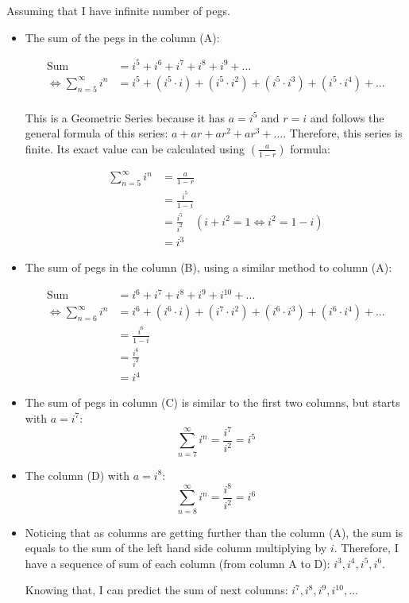 \documentclass[12pt]{article}
\begin{document}
\noindent Assuming that I have infinite number of pegs.
\begin{itemize}
    \item The sum of the pegs in the column (A):

\begin{align*}
    \text{Sum} &= i^5+ i^6+ i^7+ i^8+ i^9+ \dots\\
    \Longleftrightarrow
    \sum_{n=5}^{\infty}i^n &= i^5+ \left(i^5\cdot i\right)+ \left(i^5\cdot i^2\right)+ \left(i^5\cdot i^3\right)+ \left(i^5\cdot i^4\right)+ \dots\\
\end{align*}

This is a Geometric Series because it has $a=i^5$ and $r=i$ and follows the general formula of this series: $a+ar+ar^2+ar^3+\dots$. Therefore, this series is finite. Its exact value can be calculated using $\left(\frac{a}{1-r} \right)$ formula:

\begin{align*}
    \sum_{n=5}^{\infty}i^n &= \frac{a}{1-r}\\
    &= \frac{i^5}{1-i}\\
    &= \frac{i^5}{i^2} \quad\left(i+i^2=1\Longleftrightarrow i^2=1-i\right)\\
    &= i^3
\end{align*}

    \item The sum of pegs in the column (B), using a similar method to column (A):

\begin{align*}
    \text{Sum} &= i^6+ i^7+ i^8+ i^9+ i^{10}+ \dots\\
    \Longleftrightarrow
    \sum_{n=6}^{\infty}i^n &= i^6+ \left(i^6\cdot i\right)+ \left(i^7\cdot i^2\right)+ \left(i^6\cdot i^3\right)+ \left(i^6\cdot i^4\right)+ \dots\\
    &= \frac{i^6}{1-i}\\
    &= \frac{i^6}{i^2}\\
    &= i^4
\end{align*}

    
    \item The sum of pegs in column (C) is similar to the first two columns, but starts with $a=i^7$:
    $$\sum_{n=7}^{\infty}i^n = \frac{i^7}{i^2} = i^5$$
    
    \item The column (D) with $a=i^8$:
    $$\sum_{n=8}^{\infty}i^n = \frac{i^8}{i^2} = i^6$$
    
    \item Noticing that as columns are getting further than the column (A), the sum is equals to the sum of the left hand side column multiplying by $i$. Therefore, I have a sequence of sum of each column (from column A to D): $i^3, i^4, i^5, i^6$. \par
    Knowing that, I can predict the sum of next columns: $i^7, i^8, i^9, i^{10},\dots $


\end{itemize}
\end{document}
